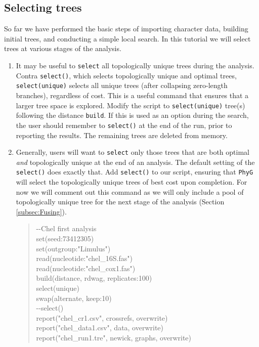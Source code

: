 \documentclass[11pt]{article}
\newcommand{\phyg}{\texttt{PhyG} }
\begin{document}
\subsection{Selecting trees}
\label{subsec:Selecting}

So far we have performed the basic steps of importing character data, building 
initial trees, and conducting a simple local search. In this tutorial we will select 
trees at various stages of the analysis. 

\begin{enumerate}

\item It may be useful to \texttt{select} all topologically unique trees during the 
analysis. Contra \texttt{select()}, which selects topologically unique and optimal 
trees, \texttt{select(unique)} selects all unique trees (after collapsing zero-length 
branches), regardless of cost. This is a useful command that ensures that a 
larger tree space is explored. Modify the script to \texttt{select(unique)} tree(s) 
following the distance \texttt{build}. If this is used as an option during the 
search, the user should remember to \texttt{select()} at the end of the run, 
prior to reporting the results. The remaining trees are deleted from memory.

\item Generally, users will want to \texttt{select} only those trees that are both 
optimal \textit{and} topologically unique at the end of an analysis. The default 
setting of the \texttt{select()} does exactly that. Add \texttt{select()} to our script, 
ensuring that \phyg will select the topologically unique trees of best cost upon 
completion. For now we will comment out this command as we will only include 
a pool of topologically unique tree for the next stage of the analysis (Section 
\ref{subsec:Fusing}).

	\begin{quote}
	-\/-Chel first analysis\\
	set(seed:73412305)\\
	set(outgroup:"Limulus")\\
	read(nucleotide:"chel\_16S.fas")\\
	read(nucleotide:"chel\_cox1.fas")\\
	build(distance, rdwag, replicates:100)\\
	select(unique)\\
	swap(alternate, keep:10)\\
	-\/-select()\\
	report("chel\_cr1.csv", crossrefs, overwrite)\\
	report("chel\_data1.csv", data, overwrite)\\
	report("chel\_run1.tre", newick, graphs, overwrite)\\
	\end{quote}

\end{enumerate}
\end{document}
